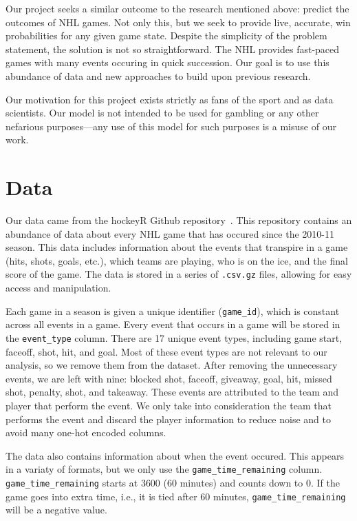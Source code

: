 \documentclass[11pt]{article}
\begin{document}
Our project seeks a similar outcome to the research mentioned above: predict the outcomes of NHL games. Not only this,
but we seek to provide live, accurate, win probabilities for any given game state. Despite the simplicity of the problem statement, 
the solution is not so straightforward. The NHL provides fast-paced games with many events
occuring in quick succession. Our goal is to use this abundance of data and new approaches to build upon previous research.

Our motivation for this project exists strictly as fans of the sport and as data scientists. Our model is not intended to be used for gambling or any other
nefarious purposes—any use of this model for such purposes is a misuse of our work.

\section{Data}
Our data came from the hockeyR Github repository~\cite{hockeyR-data}. This repository contains an abundance of data about every NHL game
that has occured since the 2010-11 season. This data includes information about the events that transpire in a game (hits, shots, goals, etc.),
which teams are playing, who is on the ice, and the final score of the game. The data is stored in a series of {\tt .csv.gz} files, allowing for
easy access and manipulation.

Each game in a season is given a unique identifier ({\tt game\_id}), which is constant across all events in a game. Every event that occurs in a game
will be stored in the {\tt event\_type} column. There are 17 unique event types, including game start, faceoff, shot, hit, and goal.
Most of these event types are not relevant to our analysis, so we remove them from the dataset. After removing the unnecessary events, we are left with
nine: blocked shot, faceoff, giveaway, goal, hit, missed shot, penalty, shot, and takeaway. These events are attributed to the
team and player that perform the event. We only take into consideration the team that performs the event and discard the player information to reduce noise and to avoid many one-hot encoded columns.

The data also contains information about when the event occured. This appears in a variaty of formats, but we only
use the {\tt game\_time\_remaining} column. {\tt game\_time\_remaining} starts
at 3600 (60 minutes) and counts down to 0. If the game goes into extra time, i.e., it is tied after 60 minutes, {\tt game\_time\_remaining} will
be a negative value.
\end{document}
